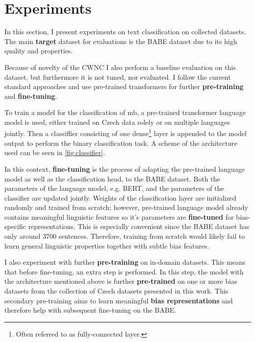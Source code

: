 \chapter{Experiments}\label{experiments}
In this section, I present experiments on text classification on collected datasets. The main \textbf{target} dataset for evaluations is the BABE dataset due to its high quality and properties.

Because of novelty of the CWNC I also perform a baseline evaluation on this dataset, but furthermore it is not tuned, nor evaluated.
I follow the current standard approaches and use pre-trained transformers for further \textbf{pre-training} and \textbf{fine-tuning}.

To train a model for the classification of \gls{mb}, a pre-trained transformer language model is used, either trained on Czech data solely or on multiple languages jointly. Then a classiffier consisting of one dense\footnote{Often referred to as fully-connected layer.} layer is appended to the model output to perform the binary classification task. A scheme of the architecture used can be seen in \ref{fig:classifier}.

In this context, \textbf{fine-tuning} is the process of adapting the pre-trained language model as well as the classification head, to the BABE dataset. Both the parameters of the language model, e.g. BERT, and the parameters of the classifier are updated jointly. Weights of the classification layer are initialized randomly and trained from scratch; however, pre-trained language model already contains meaningful linguistic features so it's parameters are \textbf{fine-tuned} for bias-specific representations. This is especially convenient since the BABE dataset has only around 3700 sentences. Therefore, training from scratch would likely fail to learn general linguistic properties together with subtle bias features.

I also experiment with further \textbf{pre-training} on in-domain datasets. This means that before fine-tuning, an extra step is performed. In this step, the model with the architecture mentioned above is further \textbf{pre-trained} on one or more bias datasets from the collection of Czech datasets presented in this work. This secondary pre-training aims to learn meaningful \textbf{bias representations} and therefore help with subsequent fine-tuning on the BABE.



